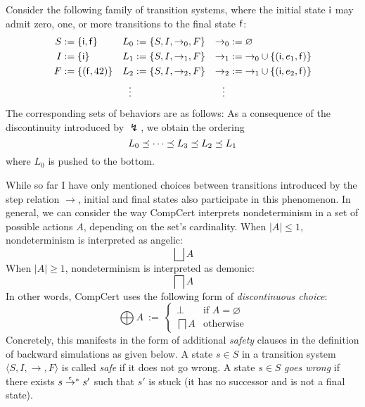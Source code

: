 \documentclass[acmsmall,review,anonymous]{acmart}\settopmatter{printfolios=true,printccs=false,printacmref=false}
\begin{document}
\begin{example} %
Consider the following family of transition systems,
where the initial state $ \mathsf{i} $ may admit zero, one, or more
transitions to the final state $ \mathsf{f} $:
\begin{align*}
  S &:= \{  \mathsf{i} ,  \mathsf{f}  \} &
  L_0 &:= \{ S, I, {\rightarrow_0}, F \} &
  {\rightarrow_0} &:= \varnothing \\
  I &:= \{  \mathsf{i}  \} &
  L_1 &:= \{ S, I, {\rightarrow_1}, F \} &
  {\rightarrow_1} &:= {\rightarrow_0} \cup
    \{ ( \mathsf{i} , e_1,  \mathsf{f} ) \} \\
  F &:= \{ ( \mathsf{f} , 42) \} &
  L_2 &:= \{ S, I, {\rightarrow_2}, F \} &
  {\rightarrow_2} &:= {\rightarrow_1} \cup
    \{ ( \mathsf{i} , e_2,  \mathsf{f} ) \} \\
  & & \vdots \: & & \vdots \:\:
\end{align*}
The corresponding sets of behaviors are as follows:
As a consequence of the discontinuity introduced by $\lightning$,
we obtain the ordering
\[
  L_0 \preceq \cdots \preceq L_3 \preceq L_2 \preceq L_1
\]
where $L_0$ is pushed to the bottom.
\end{example}

While so far I have only mentioned
choices between transitions
introduced by the step relation $\rightarrow$,
initial and final states also participate in this phenomenon.
In general,
we can consider the way CompCert interprets nondeterminism
in a set of possible actions $A$,
depending on the set's cardinality.
When $|A| \le 1$, nondeterminism is interpreted as angelic:
\[
  \bigsqcup A
\]
When $|A| \ge 1$, nondeterminism is interpreted as demonic:
\[
  \bigsqcap A
\]
In other words, CompCert uses the following form of
\emph{discontinuous choice}:
\[
  \bigoplus A \: := \:
  \begin{cases}
    \bot & \mbox{if } A = \varnothing \\
    \bigsqcap A & \mbox{otherwise}
  \end{cases}
\]
Concretely, this manifests in the form of additional
\emph{safety} clauses
in the definition of backward simulations
as given below.
A state $s \in S$
in a transition system $\langle S, I, {\rightarrow}, F \rangle$
is called \emph{safe}
if it does not go wrong.
A state $s \in S$
\emph{goes wrong} if there exists
$s \mathrel{\smash{\stackrel{\epsilon}{\rightarrow}}^*} s'$
such that $s'$ is stuck
(it has no successor and is not a final state).
\end{document}
